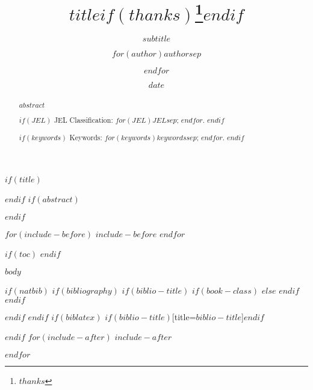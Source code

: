 \documentclass[$if(fontsize)$$fontsize$$else$11pt$endif$, titlepage]{$documentclass$}
\title{$title$$if(thanks)$\thanks{$thanks$}$endif$}
\subtitle{$subtitle$}
\author{$for(author)$$author$$sep$ \and $endfor$}
\institute{$for(institute)$$institute$$sep$ \and $endfor$}
\date{$date$}
\begin{document}
$if(title)$
\maketitle
$endif$
$if(abstract)$
\begin{abstract}
$abstract$

$if(JEL)$
\smallskip\noindent 
JEL Classification: $for(JEL)$$JEL$$sep$; $endfor$.
$endif$

$if(keywords)$
\smallskip\noindent 
Keywords: $for(keywords)$$keywords$$sep$; $endfor$.
$endif$
\end{abstract}
$endif$

$for(include-before)$
$include-before$
$endfor$ 

\clearpage
$if(toc)$
\tableofcontents
\setcounter{tocdepth}{2}
\clearpage
$endif$

$body$

$if(natbib)$
$if(bibliography)$
$if(biblio-title)$
$if(book-class)$
\renewcommand\bibname{$biblio-title$}
$else$
\renewcommand\refname{$biblio-title$}
$endif$
$endif$


$endif$
$endif$
$if(biblatex)$
\printbibliography$if(biblio-title)$[title=$biblio-title$]$endif$

$endif$
$for(include-after)$
$include-after$

$endfor$
\end{document}
